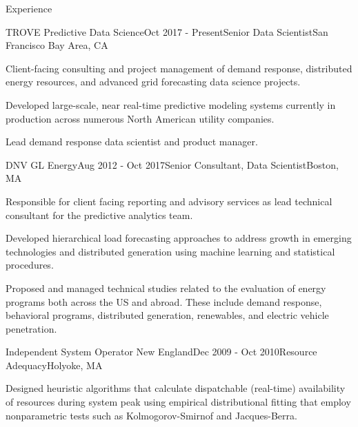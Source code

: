\documentclass{resume} %
\begin{document}

\begin{rSection}{Experience}
\begin{rSubsection}{TROVE Predictive Data Science}{Oct 2017 - Present}{Senior Data Scientist}{San Francisco Bay Area, CA}
\item Client-facing consulting and project management of demand response, distributed energy resources, and advanced grid forecasting data science projects.
\item Developed large-scale, near real-time predictive modeling systems currently in production across numerous North American utility companies.
\item Lead demand response data scientist and product manager.
\end{rSubsection}


\begin{rSubsection}{DNV GL Energy}{Aug 2012 - Oct 2017}{Senior Consultant, Data Scientist}{Boston, MA}
\item Responsible for client facing reporting and advisory services as lead technical consultant for the  predictive analytics team.
\item Developed hierarchical load forecasting approaches to address growth in emerging technologies and distributed generation using machine learning and statistical procedures.
\item Proposed and managed technical studies related to the evaluation of energy programs both across the US and abroad. These include demand response, behavioral programs, distributed generation, renewables, and electric vehicle  penetration. 

\end{rSubsection}


\begin{rSubsection}{Independent System Operator New England}{Dec 2009 - Oct 2010}{Resource Adequacy}{Holyoke, MA}

\item Designed heuristic algorithms that calculate dispatchable (real-time) availability of resources during system peak using empirical distributional fitting that employ nonparametric tests such as Kolmogorov-Smirnof and Jacques-Berra.


\end{rSubsection}
\end{rSection}
\end{document}
